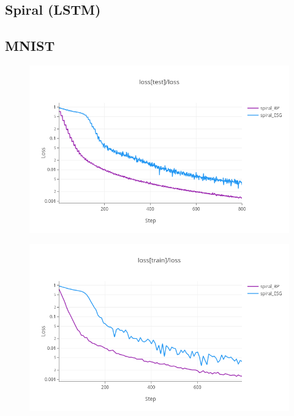 \documentclass[nohyperref]{article}
\theoremstyle{plain}
\theoremstyle{definition}
\theoremstyle{remark}
\begin{document}
\subsection{Spiral (LSTM)}
\subsection{MNIST}
\begin{figure}[ht]
\vskip 0.2in
\begin{center}
\centerline{\includegraphics[width=\columnwidth]{images/spiral_test.png}}
\caption{}
\end{center}
\vskip -0.2in
\end{figure}
\begin{figure}[ht]
\vskip 0.2in
\begin{center}
\centerline{\includegraphics[width=\columnwidth]{images/spiral_train.png}}
\caption{}
\end{center}
\vskip -0.2in
\end{figure}
\end{document}
